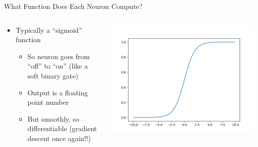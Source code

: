 \documentclass[aspectratio=169]{beamer}
\begin{document}
\begin{frame}{What Function Does Each Neuron Compute?}

\begin{columns}
\begin{column}{0.6\textwidth}
\begin{itemize}
	\item Typically a ``sigmoid'' function
	\begin{itemize}
	\item So neuron goes from ``off'' to ``on'' (like a soft binary gate)
	\item Output is a floating point number
	\item But smoothly, so differentiable (gradient descent once again!!)
	\end{itemize}
\end{itemize}
\end{column}
\begin{column}{0.4\textwidth}

\includegraphics[width=1\textwidth]{lectFF/sigmoid2.png}
\end{column}
\end{columns}
\end{frame}
\end{document}
